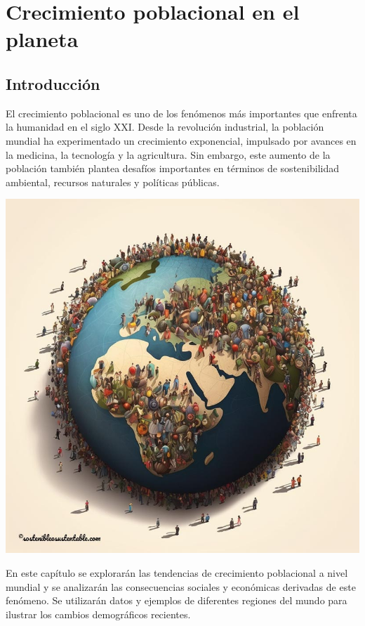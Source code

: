 \chapter{Crecimiento poblacional en el planeta}

\section{Introducción}

El crecimiento poblacional es uno de los fenómenos más importantes que enfrenta la humanidad en el siglo XXI. Desde la revolución industrial, la población mundial ha experimentado un crecimiento exponencial, impulsado por avances en la medicina, la tecnología y la agricultura. Sin embargo, este aumento de la población también plantea desafíos importantes en términos de sostenibilidad ambiental, recursos naturales y políticas públicas.

\begin{imagen}[h!]
	\centering
	\includegraphics[width=\textwidth]{./media/people.jpg}
	\caption{}
\end{imagen}

En este capítulo se explorarán las tendencias de crecimiento poblacional a nivel mundial y se analizarán las consecuencias sociales y económicas derivadas de este fenómeno. Se utilizarán datos y ejemplos de diferentes regiones del mundo para ilustrar los cambios demográficos recientes.

